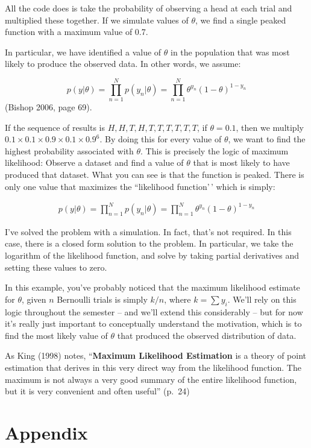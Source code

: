 \documentclass[
]{book}
\begin{document}
All the code does is take the probability of observing a head at each trial and multiplied these together. If we simulate values of \(\theta\), we find a single peaked function with a maximum value of 0.7.

In particular, we have identified a value of \(\theta\) in the population that was most likely to produce the observed data. In other words, we assume:

\[p(y|\theta)=\prod_{n=1}^Np(y_n|\theta)=\prod_{n=1}^N\theta^{y_n}(1-\theta)^{1-{y_n}}\] (Bishop 2006, page 69).

If the sequence of results is \({H,H, T, H, T, T, T, T, T, T}\), if \(\theta=0.1\), then we multiply \(0.1 \times 0.1 \times 0.9 \times 0.1 \times 0.9^6\). By doing this for every value of \(\theta\), we want to find the highest probability associated with \(\theta\). This is precisely the logic of maximum likelihood: Observe a dataset and find a value of \(\theta\) that is most likely to have produced that dataset. What you can see is that the function is peaked. There is only one value that maximizes the ``likelihood function'\,' which is simply:

\begin{eqnarray}
p(y|\theta)=\prod_{n=1}^Np(y_n|\theta)=\prod_{n=1}^N\theta^{y_n}(1-\theta)^{1-{y_n}}
\end{eqnarray}

I've solved the problem with a simulation. In fact, that's not required. In this case, there is a closed form solution to the problem. In particular, we take the logarithm of the likelihood function, and solve by taking partial derivatives and setting these values to zero.

In this example, you've probably noticed that the maximum likelihood estimate for \(\theta\), given \(n\) Bernoulli trials is simply \(k/n\), where \(k=\sum y_i\). We'll rely on this logic throughout the semester -- and we'll extend this considerably -- but for now it's really just important to conceptually understand the motivation, which is to find the most likely value of \(\theta\) that produced the observed distribution of data.

As King (1998) notes, ``\textbf{Maximum Likelihood Estimation} is a theory of point estimation that derives in this very direct way from the likelihood function. The maximum is not always a very good summary of the entire likelihood function, but it is very convenient and often useful'' (p.~24)

\section{Appendix}\label{appendix}
\end{document}
